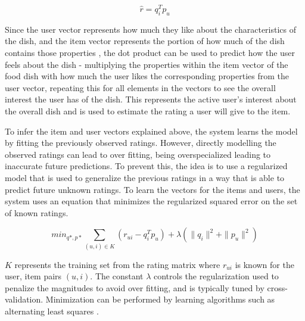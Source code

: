 \begin{equation}\label{eq:1}\tag{1} \widehat{r} = q_{i}^T p_{u} \end{equation}

Since the user vector represents how much they like about the characteristics of the dish, and the item vector represents the portion of how much of the dish contains those properties \cite{koren2009matrix}, the dot product can be used to predict how the user feels about the dish - multiplying the properties within the item vector of the food dish with how much the user likes the corresponding properties from the user vector, repeating this for all elements in the vectors to see the overall interest the user has of the dish. This represents the active user's interest about the overall dish and is used to estimate the rating a user will give to the item. 

To infer the item and user vectors explained above, the system learns the model by fitting the previously observed ratings. However, directly modelling the observed ratings can lead to over fitting, being overspecialized leading to inaccurate future predictions. To prevent this, the idea is to use a regularized model that is used to generalize the previous ratings in a way that is able to predict future unknown ratings. To learn the vectors for the items and users, the system uses an equation that minimizes the regularized squared error on the set of known ratings.

\begin{equation}\label{eq:2}\tag{2}
\displaystyle min_{q*,p*} \sum_{ (u,i) \in K} (r_{ui} - q_{i}^T p_{u}) + \lambda (\| q_{i} \|^2 + \| p_{u} \|^2 )
\end{equation}

\begin{math} K \end{math} represents the training set from the rating matrix where \begin{math} r_{ui} \end{math} is known for the user, item pairs \begin{math} (u,i) \end{math}. The constant \begin{math}\lambda\end{math} controls the regularization used to penalize the magnitudes to avoid over fitting, and is typically tuned by cross-validation. Minimization can be performed by learning algorithms such as alternating least squares \cite{koren2011}.

